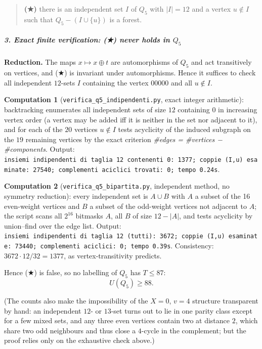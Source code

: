 \documentclass[11pt,a4paper]{article}
\begin{document}
\begin{quote}
\textbf{(★)} there is an independent set \(I\) of \(Q_5\) with
\(|I|=12\) and a vertex \(u\notin I\) such that \(Q_5-(I\cup\{u\})\) is
a forest.
\end{quote}

\subparagraph{\texorpdfstring{3. Exact finite verification: (★) never
holds in
\(Q_5\)}{3. Exact finite verification: (★) never holds in Q\_5}}\label{exact-finite-verification-never-holds-in-q_5}

\textbf{Reduction.} The maps \(x\mapsto x\oplus t\) are automorphisms of
\(Q_5\) and act transitively on vertices, and (★) is invariant under
automorphisms. Hence it suffices to check all independent \(12\)-sets
\(I\) containing the vertex \(00000\) and all \(u\notin I\).

\textbf{Computation 1} (\texttt{verifica\_q5\_indipendenti.py}, exact
integer arithmetic): backtracking enumerates all independent sets of
size \(12\) containing \(0\) in increasing vertex order (a vertex may be
added iff it is neither in the set nor adjacent to it), and for each of
the \(20\) vertices \(u\notin I\) tests acyclicity of the induced
subgraph on the \(19\) remaining vertices by the exact criterion
\emph{\#edges = \#vertices − \#components}. Output:
\texttt{insiemi\ indipendenti\ di\ taglia\ 12\ contenenti\ 0:\ 1377;\ coppie\ (I,u)\ esaminate:\ 27540;\ complementi\ aciclici\ trovati:\ 0;\ tempo\ 0.24s}.

\textbf{Computation 2} (\texttt{verifica\_q5\_bipartita.py}, independent
method, no symmetry reduction): every independent set is \(A\cup B\)
with \(A\) a subset of the 16 even-weight vertices and \(B\) a subset of
the odd-weight vertices not adjacent to \(A\); the script scans all
\(2^{16}\) bitmasks \(A\), all \(B\) of size \(12-|A|\), and tests
acyclicity by union--find over the edge list. Output:
\texttt{insiemi\ indipendenti\ di\ taglia\ 12\ (tutti):\ 3672;\ coppie\ (I,u)\ esaminate:\ 73440;\ complementi\ aciclici:\ 0;\ tempo\ 0.39s}.
Consistency: \(3672\cdot 12/32=1377\), as vertex-transitivity predicts.

Hence (★) is false, so no labelling of \(Q_5\) has \(T\le87\):
\[U(Q_5)\ge 88.\]

(The counts also make the impossibility of the \(X=0\), \(v=4\)
structure transparent by hand: an independent \(12\)- or \(13\)-set
turns out to lie in one parity class except for a few mixed sets, and
any three even vertices contain two at distance \(2\), which share two
odd neighbours and thus close a \(4\)-cycle in the complement; but the
proof relies only on the exhaustive check above.)
\end{document}
